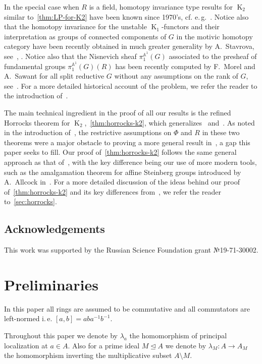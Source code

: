 \documentclass[oneside, 10pt]{amsart}
\DeclareMathOperator{\K}{K}
\numberwithin{equation}{section}
\numberwithin{thm}{section}
\numberwithin{lemma}{section}
\theoremstyle{definition}
\theoremstyle{remark}
\begin{document}
In the special case when $R$ is a field, homotopy invariance type results for $\K_2$ similar to~\cref{thm:LP-for-K2} have been known since 1970's, cf. e.\,g.~\cite{Hur77, Re75, VW16}.
Notice also that the homotopy invariance for the unstable $\K_1$-functors and their interpretation as groups of connected components of $G$ in the motivic homotopy category
have been recently obtained in much greater generality by A.~Stavrova, see~\cite[Theorem~1.3]{St-poly}, \cite[Theorem~5.2]{St22}.
Notice also that the Nisnevich sheaf $\pi_1^{\mathbb{A}^1}(G)$ associated to the presheaf of fundamental groups $\pi_1^{\mathbb{A}^1}(G)(R)$
has been recently computed by F.~Morel and A.~Sawant for all split reductive $G$ without any assumptions on the rank of $G$, see~\cite[Theorem~1]{MS23}.
For a more detailed historical account of the problem, we refer the reader to the introduction of~\cite{LSV2}.

The main technical ingredient in the proof of all our results is the refined Horrocks theorem for $\K_2$,~\cref{thm:horrocks-k2},
which generalizes~\cite[Theorem~1]{LS20} and~\cite[Proposition~4.3]{Tu83}.
As noted in the introduction of~\cite{LSV2}, the restrictive assumptions on $\Phi$ and $R$ in these two theorems were a major obstacle to proving a more
general result in~\cite{LSV2}, a gap this paper seeks to fill.
Our proof of~\cref{thm:horrocks-k2} follows the same general approach as that of~\cite[Proposition~4.3]{Tu83},
with the key difference being our use of more modern tools, such as the amalgamation theorem for affine Steinberg groups introduced by A.~Allcock in~\cite{A13}.
For a more detailed discussion of the ideas behind our proof of~\cref{thm:horrocks-k2} and its key differences from~\cite{LS20, Tu83}, we refer the reader to~\cref{sec:horrocks}.


\subsection{Acknowledgements}
This work was supported by the Russian Science Foundation grant №19-71-30002.

\section{Preliminaries}\label{sec:preliminaries}

In this paper all rings are assumed to be commutative and all commutators are left-normed i.\,e. $[a, b] = a b a^{-1} b^{-1}$.

Throughout this paper we denote by $\lambda_a$ the homomorphism of principal localization at $a \in A$.
Also for a prime ideal $M \trianglelefteq A$ we denote by $\lambda_M \colon A \to A_M$ the homomorphism inverting the multiplicative subset $A \setminus M$.
\end{document}
